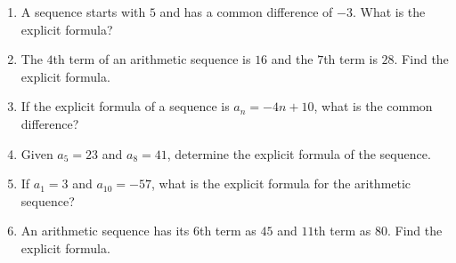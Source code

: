 \documentclass{article}
\begin{document}
\begin{enumerate}[itemsep=2em]
    \item A sequence starts with $5$ and has a common difference of $-3$. What is the explicit formula?
    
    \item The $4$th term of an arithmetic sequence is $16$ and the $7$th term is $28$. Find the explicit formula.
    
    \item If the explicit formula of a sequence is $a_n = -4n + 10$, what is the common difference?
    
    \item Given $a_5 = 23$ and $a_8 = 41$, determine the explicit formula of the sequence.
    
    \item If $a_1 = 3$ and $a_10 = -57$, what is the explicit formula for the arithmetic sequence?
    
    \item An arithmetic sequence has its $6$th term as $45$ and $11$th term as $80$. Find the explicit formula.
\end{enumerate}
\end{document}
